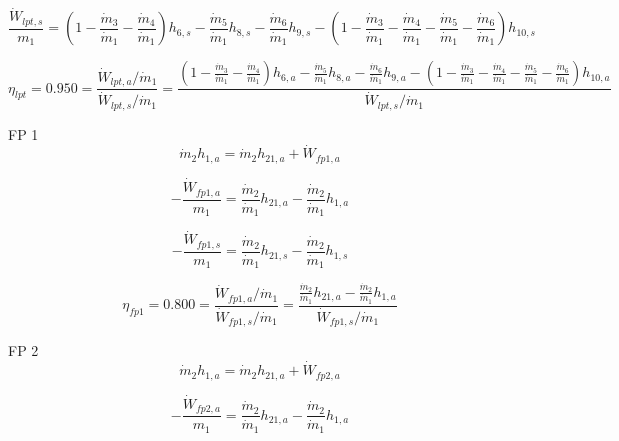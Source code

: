 \documentclass{article}
\begin{document}
\begin{equation}
\frac{\dot{W}_{lpt,s}}{m_1} = (1 - \frac{\dot{m}_{ 3}}{\dot{m}_{ 1}} - \frac{\dot{m}_{ 4}}{\dot{m}_{ 1}})h_{ 6,s} - \frac{\dot{m}_{ 5}}{\dot{m}_{ 1}}h_{ 8,s} - \frac{\dot{m}_{ 6}}{\dot{m}_{ 1}}h_{ 9,s} - (1 - \frac{\dot{m}_{ 3}}{\dot{m}_{ 1}} - \frac{\dot{m}_{ 4}}{\dot{m}_{ 1}} - \frac{\dot{m}_{ 5}}{\dot{m}_{ 1}} - \frac{\dot{m}_{ 6}}{\dot{m}_{ 1}})h_{10,s}\end{equation}

\begin{equation}
\eta_{lpt} =    0.950 = \frac{\dot{W}_{lpt,a} / \dot{m}_{1}}{\dot{W}_{lpt,s} / \dot{m}_{1}} = \frac{
(1 - \frac{\dot{m}_{ 3}}{\dot{m}_{ 1}} - \frac{\dot{m}_{ 4}}{\dot{m}_{ 1}})h_{ 6,a} - \frac{\dot{m}_{ 5}}{\dot{m}_{ 1}}h_{ 8,a} - \frac{\dot{m}_{ 6}}{\dot{m}_{ 1}}h_{ 9,a} - (1 - \frac{\dot{m}_{ 3}}{\dot{m}_{ 1}} - \frac{\dot{m}_{ 4}}{\dot{m}_{ 1}} - \frac{\dot{m}_{ 5}}{\dot{m}_{ 1}} - \frac{\dot{m}_{ 6}}{\dot{m}_{ 1}})h_{10,a}}{\dot{W}_{lpt,s} / \dot{m}_{1}}
\end{equation}


FP 1
\begin{equation}
\dot{m}_{ 2}h_{ 1,a} = \dot{m}_{ 2}h_{21,a} + \dot{W}_{fp1,a}
\end{equation}

\begin{equation}
-\frac{\dot{W}_{fp1,a}}{m_1} = \frac{\dot{m}_{ 2}}{\dot{m}_{ 1}}h_{21,a} - \frac{\dot{m}_{ 2}}{\dot{m}_{ 1}}h_{ 1,a}\end{equation}

\begin{equation}
-\frac{\dot{W}_{fp1,s}}{m_1} = \frac{\dot{m}_{ 2}}{\dot{m}_{ 1}}h_{21,s} - \frac{\dot{m}_{ 2}}{\dot{m}_{ 1}}h_{ 1,s}\end{equation}

\begin{equation}
\eta_{fp1} =    0.800 = \frac{\dot{W}_{fp1,a} / \dot{m}_{1}}{\dot{W}_{fp1,s} / \dot{m}_{1}} = \frac{
\frac{\dot{m}_{ 2}}{\dot{m}_{ 1}}h_{21,a} - \frac{\dot{m}_{ 2}}{\dot{m}_{ 1}}h_{ 1,a}}{\dot{W}_{fp1,s} / \dot{m}_{1}}
\end{equation}


FP 2
\begin{equation}
\dot{m}_{ 2}h_{ 1,a} = \dot{m}_{ 2}h_{21,a} + \dot{W}_{fp2,a}
\end{equation}

\begin{equation}
-\frac{\dot{W}_{fp2,a}}{m_1} = \frac{\dot{m}_{ 2}}{\dot{m}_{ 1}}h_{21,a} - \frac{\dot{m}_{ 2}}{\dot{m}_{ 1}}h_{ 1,a}\end{equation}
\end{document}
